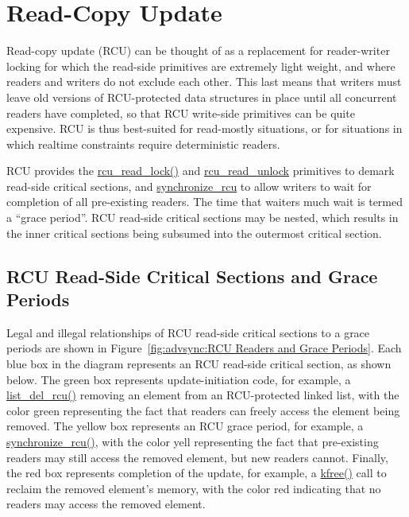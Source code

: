 
\section{Read-Copy Update}
\label{sec:advsync:Read-Copy Update}

Read-copy update (RCU) can be thought of as a replacement for
reader-writer locking for
which the read-side primitives are extremely light weight, and where
readers and writers do not exclude each other.
This last means that writers must leave old versions
of RCU-protected data structures
in place until all concurrent readers have completed,
so that RCU write-side primitives can be quite expensive.
RCU is thus best-suited for read-mostly situations, or for situations
in which realtime constraints require deterministic readers.

RCU provides the \url{rcu_read_lock()} and \url{rcu_read_unlock}
primitives to demark read-side critical sections, and
\url{synchronize_rcu} to allow writers to wait for completion
of all pre-existing readers.
The time that waiters much wait is termed a ``grace period''.
RCU read-side critical sections may be nested, which results in
the inner critical sections being subsumed into the outermost critical
section.

\subsection{RCU Read-Side Critical Sections and Grace Periods}
\label{sec:advsync:RCU Read-Side Critical Sections and Grace Periods}

Legal and illegal relationships of RCU read-side critical sections
to a grace periods are shown in
Figure~\ref{fig:advsync:RCU Readers and Grace Periods}.
Each blue box in the diagram represents an RCU read-side critical
section, as shown below.
The green box represents update-initiation code, for example, a
\url{list_del_rcu()} removing an element from an RCU-protected linked list,
with the color green representing the fact that readers can freely
access the element being removed.
The yellow box represents an RCU grace period, for example, a
\url{synchronize_rcu()}, with the color yell representing the fact that
pre-existing readers may still access the removed element, but new
readers cannot.
Finally, the red box represents completion
of the update, for example, a \url{kfree()} call to reclaim the removed
element's memory, with the color red indicating that no readers may
access the removed element.

